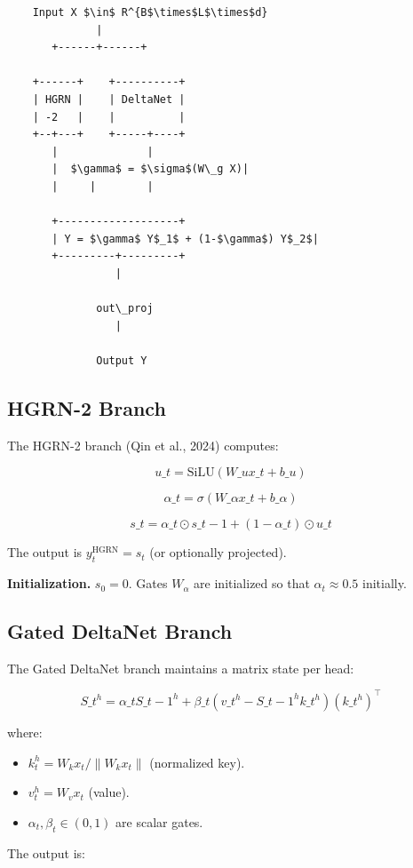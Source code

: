 \begin{lstlisting}
    Input X $\in$ R^{B$\times$L$\times$d}
              |
       +------+------+
                      
    +------+    +----------+
    | HGRN |    | DeltaNet |
    | -2   |    |          |
    +--+---+    +-----+----+
       |              |
       |  $\gamma$ = $\sigma$(W\_g X)|
       |     |        |
                       
       +-------------------+
       | Y = $\gamma$ Y$_1$ + (1-$\gamma$) Y$_2$|
       +---------+---------+
                 |
                  
              out\_proj
                 |
                  
              Output Y
\end{lstlisting}

\subsection{HGRN-2 Branch}

The HGRN-2 branch (Qin et al., 2024) computes:

\[
u\_t = \text{SiLU}(W\_u x\_t + b\_u)
\tag{4.1}
\]

\[
\alpha\_t = \sigma(W\_\alpha x\_t + b\_\alpha)
\tag{4.2}
\]

\[
s\_t = \alpha\_t \odot s\_{t-1} + (1 - \alpha\_t) \odot u\_t
\tag{4.3}
\]

The output is $y_t^\text{HGRN} = s_t$ (or optionally projected).

\textbf{Initialization.} $s_0 = 0$. Gates $W_\alpha$ are initialized so that 
$\alpha_t \approx 0.5$ initially.

\subsection{Gated DeltaNet Branch}

The Gated DeltaNet branch maintains a matrix state per head:

\[
S\_t^h = \alpha\_t S\_{t-1}^h + \beta\_t (v\_t^h - S\_{t-1}^h k\_t^h) (k\_t^h)^\top
\tag{4.4}
\]

where:

\begin{itemize}
\item $k_t^h = W_k x_t / \|W_k x_t\|$ (normalized key).
\item $v_t^h = W_v x_t$ (value).
\item $\alpha_t, \beta_t \in (0, 1)$ are scalar gates.

\end{itemize}
The output is:

